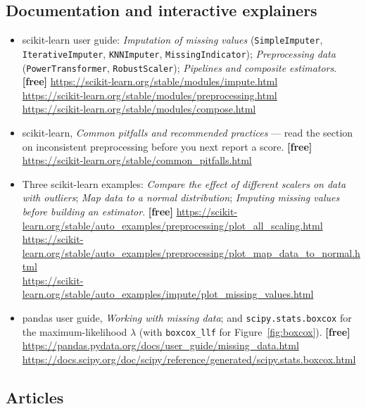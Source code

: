 \documentclass[11pt]{article}
\begin{document}
\subsection*{Documentation and interactive explainers}

\begin{itemize}[leftmargin=*]
  \item scikit-learn user guide: \emph{Imputation of missing values}
    (\texttt{SimpleImputer}, \texttt{IterativeImputer}, \texttt{KNNImputer},
    \texttt{MissingIndicator}); \emph{Preprocessing data}
    (\texttt{PowerTransformer}, \texttt{RobustScaler}); \emph{Pipelines and
    composite estimators}. \textbf{[free]}
    \url{https://scikit-learn.org/stable/modules/impute.html} \\
    \url{https://scikit-learn.org/stable/modules/preprocessing.html} \\
    \url{https://scikit-learn.org/stable/modules/compose.html}
  \item scikit-learn, \emph{Common pitfalls and recommended practices} --- read
    the section on inconsistent preprocessing before you next report a score.
    \textbf{[free]} \url{https://scikit-learn.org/stable/common_pitfalls.html}
  \item Three scikit-learn examples: \emph{Compare the effect of different
    scalers on data with outliers}; \emph{Map data to a normal distribution};
    \emph{Imputing missing values before building an estimator}.
    \textbf{[free]}
    \url{https://scikit-learn.org/stable/auto_examples/preprocessing/plot_all_scaling.html}
    \\
    \url{https://scikit-learn.org/stable/auto_examples/preprocessing/plot_map_data_to_normal.html}
    \\
    \url{https://scikit-learn.org/stable/auto_examples/impute/plot_missing_values.html}
  \item pandas user guide, \emph{Working with missing data}; and
    \texttt{scipy.stats.boxcox} for the maximum-likelihood $\lambda$ (with
    \texttt{boxcox\_llf} for Figure~\ref{fig:boxcox}). \textbf{[free]}
    \url{https://pandas.pydata.org/docs/user_guide/missing_data.html} \\
    \url{https://docs.scipy.org/doc/scipy/reference/generated/scipy.stats.boxcox.html}
\end{itemize}

\subsection*{Articles}
\end{document}
